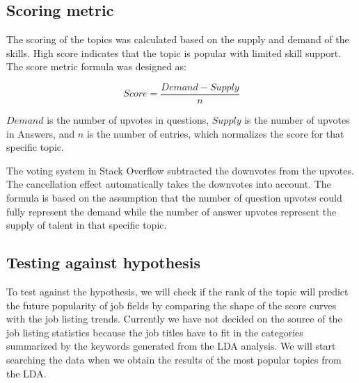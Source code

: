 
\subsection{Scoring metric}

The scoring of the topics was calculated based on the supply and demand of the skills. High score indicates that the topic is popular with limited skill support. The score metric formula was designed as:

\begin{equation} \label{eq:1}
	Score = \frac{Demand - Supply}{n}
\end{equation}

$Demand$ is the number of upvotes in questions, $Supply$ is the number of upvotes in Answers, and $n$ is the number of entries, which normalizes the score for that specific topic. 

The voting system in Stack Overflow subtracted the downvotes from the upvotes. The cancellation effect automatically takes the downvotes into account. The formula is based on the assumption that the number of question upvotes could fully represent the demand while the number of answer upvotes represent the supply of talent in that specific topic.


\subsection{Testing against hypothesis}
To test against the hypothesis, we will check if the rank of the topic will predict the future popularity of  job fields by comparing the shape of the score curves with the job listing trends. Currently we have not decided on the source of the job listing statistics because the job titles have to fit in the categories summarized by the keywords generated from the LDA analysis. We will start searching the data when we obtain the results of the most popular topics from the LDA.


